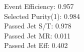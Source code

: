 Event Efficiency:   0.957\\ 
Selected Purity(1): 0.984\\ 
Passed Jet S/T:     0.978\\ 
Passed Jet MR:      0.011\\ 
Passed Jet Eff:     0.402